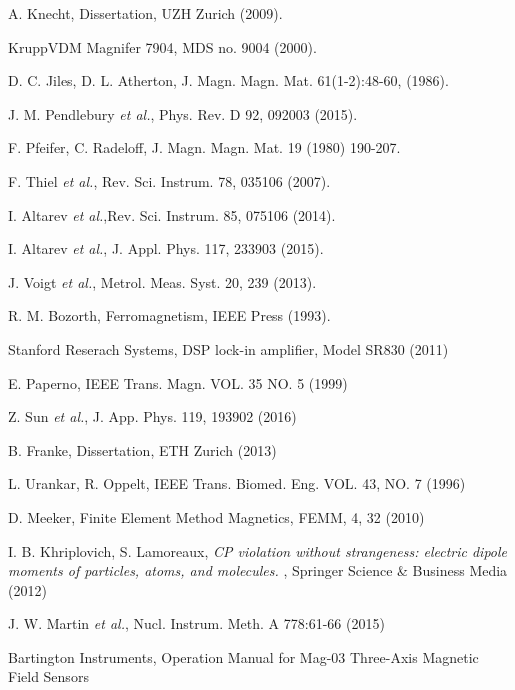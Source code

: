 \documentclass[review]{elsarticle}
\begin{document}
\begin{thebibliography}{00}
 A. Knecht, Dissertation, UZH Zurich (2009).

 KruppVDM Magnifer 7904, MDS no. 9004 (2000).

 D. C. Jiles, D. L. Atherton,  J. Magn. Magn. Mat. 61(1-2):48-60, (1986).

 J. M. Pendlebury {\it et al.}, Phys. Rev. D 92, 092003 (2015).

 F. Pfeifer, C. Radeloff, J. Magn. Magn. Mat. 19 (1980) 190-207.

 F. Thiel {\it et al.}, Rev. Sci. Instrum. 78, 035106 (2007).

 I. Altarev {\it et al.},Rev. Sci. Instrum. 85, 075106 (2014).

 I. Altarev {\it et al.}, J. Appl. Phys. 117, 233903 (2015).

 J. Voigt {\it et al.}, Metrol. Meas. Syst. 20, 239 (2013).

 R. M. Bozorth, Ferromagnetism, IEEE Press (1993).

 Stanford Reserach Systems, DSP lock-in amplifier, Model SR830 (2011)

 E. Paperno, IEEE Trans. Magn. VOL. 35 NO. 5 (1999)

 Z. Sun {\it et al.}, J. App. Phys. 119, 193902 (2016)

 B. Franke, Dissertation, ETH Zurich (2013)

 L. Urankar, R. Oppelt, IEEE Trans. Biomed. Eng. VOL. 43, NO. 7 (1996) 

 D. Meeker, Finite Element Method Magnetics, FEMM, 4, 32 (2010)

 I. B. Khriplovich, S. Lamoreaux, { \it CP violation without strangeness: electric dipole moments of particles, atoms, and molecules. }, Springer Science \& Business Media (2012)

 J. W. Martin {\it et al.}, Nucl. Instrum. Meth. A 778:61-66 (2015) 

 Bartington Instruments, Operation Manual for Mag-03 Three-Axis Magnetic Field Sensors 
\end{thebibliography}
\end{document}
